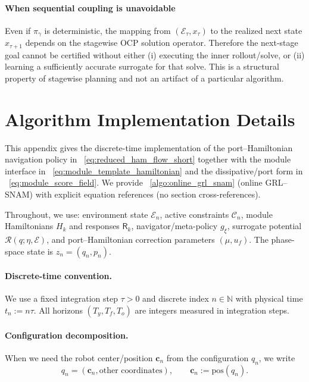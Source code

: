 \documentclass{article} %
\let\vec=\boldsymbol
\begin{document}
\paragraph{When sequential coupling is unavoidable}
\label{rem:sequential_unavoidable}
Even if $\pi_\gamma$ is deterministic, the mapping from $(\mathcal E_\tau,x_\tau)$ to the realized next state $x_{\tau+1}$
depends on the stagewise OCP solution operator. Therefore the next-stage goal cannot be certified without either
(i) executing the inner rollout/solve, or (ii) learning a sufficiently accurate surrogate for that solve.
This is a structural property of stagewise planning and not an artifact of a particular algorithm.


\section{Algorithm Implementation Details}
\label{app:algorithm_details}

This appendix gives the discrete-time implementation of the port--Hamiltonian navigation policy in
~\cref{eq:reduced_ham_flow_short} together with the module interface in
~\cref{eq:module_template_hamiltonian} and the dissipative/port form in
~\cref{eq:module_score_field}. We provide ~\cref{algo:online_grl_snam} (online GRL--SNAM)
with explicit equation references (no section cross-references).

Throughout, we use: environment state $\mathcal{E}_n$, active constraints $\mathcal{C}_n$, module
Hamiltonians $H_k$ and responses $\mathsf{R}_k$, navigator/meta-policy $g_\xi$, surrogate potential
$\mathcal{R}(q;\eta,\mathcal{E})$, and port--Hamiltonian correction parameters
$(\mu, u_f)$. The phase-space state is $z_n=(q_n,p_n)$.

\paragraph{Discrete-time convention.}
We use a fixed integration step $\tau>0$ and discrete index $n\in\mathbb{N}$ with physical time
$t_n := n\tau$. All horizons $(T_y,T_f,T_o)$ are integers measured in integration steps.

\paragraph{Configuration decomposition.}
When we need the robot center/position $\vec c_n$ from the configuration $q_n$, we write
\begin{equation}
\label{eq:impl:config_decomp}
q_n = (\vec c_n, \text{other coordinates}),\qquad \vec c_n := \mathrm{pos}(q_n).
\end{equation}
\end{document}
